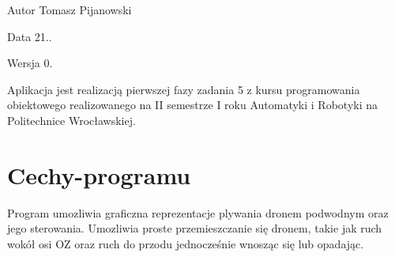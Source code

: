 \begin{DoxyAuthor}{Autor}
Tomasz Pijanowski 
\end{DoxyAuthor}
\begin{DoxyDate}{Data}
21.. 
\end{DoxyDate}
\begin{DoxyVersion}{Wersja}
0.
\end{DoxyVersion}
Aplikacja jest realizacją pierwszej fazy zadania 5 z kursu programowania obiektowego realizowanego na II semestrze I roku Automatyki i Robotyki na Politechnice Wrocławskiej.\hypertarget{index_Cechy-programu}{}\section{Cechy-\/programu}\label{index_Cechy-programu}
Program umozliwia graficzna reprezentacje plywania dronem podwodnym oraz jego sterowania. Umozliwia proste przemieszczanie się dronem, takie jak ruch wokół osi OZ oraz ruch do przodu jednocześnie wnosząc się lub opadając. 